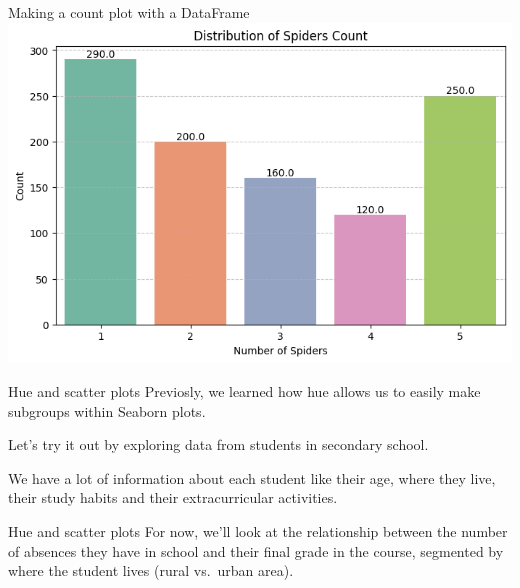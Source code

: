 \documentclass[
  ignorenonframetext,
]{beamer}
\begin{document}
\begin{frame}{Making a count plot with a DataFrame}
\label{making-a-count-plot-with-a-dataframe-5}
\includegraphics{../images/im258.png}
\end{frame}

\begin{frame}{Hue and scatter plots}
\label{hue-and-scatter-plots}
Previosly, we learned how hue allows us to easily make subgroups within
Seaborn plots.

Let's try it out by exploring data from students in secondary school.

We have a lot of information about each student like their age, where
they live, their study habits and their extracurricular activities.
\end{frame}

\begin{frame}{Hue and scatter plots}
\label{hue-and-scatter-plots-1}
For now, we'll look at the relationship between the number of absences
they have in school and their final grade in the course, segmented by
where the student lives (rural vs.~urban area).
\end{frame}
\end{document}
